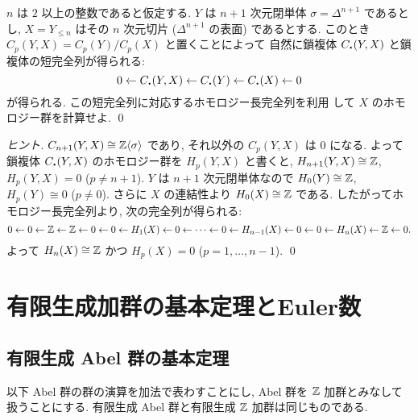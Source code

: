 \documentclass[12pt,twoside]{jarticle}
\begin{document}
\begin{question}[$n$ 次元球面]
  $n$ は $2$ 以上の整数であると仮定する.
  $Y$ は $n+1$ 次元閉単体 $\sigma=\Delta^{n+1}$ であるとし, 
  $X=Y_{\le n}$ はその $n$ 次元切片 ($\Delta^{n+1}$ の表面) であるとする. 
  このとき $C_p(Y,X)=C_p(Y)/C_p(X)$ と置くことによって
  自然に鎖複体 $C_\bcdot(Y,X)$ と鎖複体の短完全列が得られる:
  \begin{equation*}
    0
    \leftarrow C_\bcdot(Y,X) 
    \leftarrow C_\bcdot(Y)
    \leftarrow C_\bcdot(X)
    \leftarrow 0
  \end{equation*}
  が得られる. この短完全列に対応するホモロジー長完全列を利用
  して $X$ のホモロジー群を計算せよ.
  \qed
\end{question}

\begin{proof}[ヒント]
  $C_{n+1}(Y,X)\cong{\mathbb Z}\langle\sigma\rangle$ であり, 
  それ以外の $C_p(Y,X)$ は $0$ になる.
  よって鎖複体 $C_\bcdot(Y,X)$ のホモロジー群を $H_p(Y,X)$ と書くと,
  $H_{n+1}(Y,X)\cong{\mathbb Z}$, $H_p(Y,X)=0$ ($p\ne n+1$).
  $Y$ は $n+1$ 次元閉単体なので $H_0(Y)\cong{\mathbb Z}$, $H_p(Y)\cong 0$ ($p\ne 0$).
  さらに $X$ の連結性より $H_0(X)\cong{\mathbb Z}$ である.
  したがってホモロジー長完全列より, 次の完全列が得られる:
  \begin{equation*}
    0
    \leftarrow 0
    \leftarrow {\mathbb Z}
    \leftarrow {\mathbb Z}
    \leftarrow 0
    \leftarrow 0
    \leftarrow H_1(X)
    \leftarrow 0
    \leftarrow \cdots
    \leftarrow 0
    \leftarrow H_{n-1}(X)
    \leftarrow 0
    \leftarrow 0
    \leftarrow H_n(X)
    \leftarrow {\mathbb Z}
    \leftarrow 0.
  \end{equation*}
  よって $H_n(X)\cong{\mathbb Z}$ かつ $H_p(X)=0$ ($p=1,\ldots,n-1$).
  \qed
\end{proof}


\section{有限生成加群の基本定理とEuler数}


\subsection{有限生成 Abel 群の基本定理}

以下 Abel 群の群の演算を加法で表わすことにし, Abel 群を ${\mathbb Z}$ 加群とみなして
扱うことにする. 有限生成 Abel 群と有限生成 ${\mathbb Z}$ 加群は同じものである.
\end{document}
